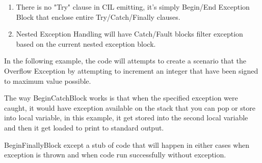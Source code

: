 \begin{enumerate}
\item There is no "Try" clause in CIL emitting, it's simply Begin/End Exception Block that enclose entire Try/Catch/Finally clauses.
\item Nested Exception Handling will have Catch/Fault blocks filter exception based on the current nested exception block.
\end{enumerate}

In the following example, the code will attempts to create a scenario that the Overflow Exception by attempting to increment an integer that have been signed to maximum value possible.



The way BeginCatchBlock works is that when the specified exception were caught, it would have exception available on the stack that you can pop or store into local variable, in this example, it get stored into the second local variable and then it get loaded to print to standard output.

BeginFinallyBlock except a stub of code that will happen in either cases when exception is thrown and when code run successfully without exception.
